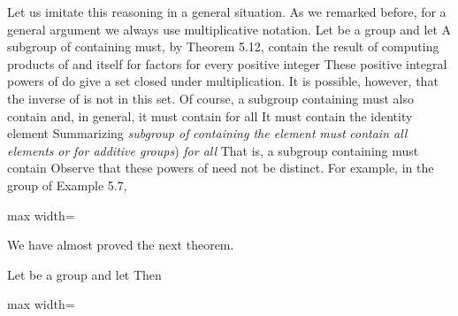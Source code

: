 \documentclass[11pt,oneside]{article}
\begin{document}
\begin{BookBody}
Let us imitate this reasoning in a general situation. As we remarked before, for a general argument we always use multiplicative notation. Let  be a group and let  A subgroup of  containing  must, by Theorem 5.12, contain  the result of computing products of  and itself for  factors for every positive integer  These positive integral powers of  do give a set closed under multiplication. It is possible, however, that the inverse of  is not in this set. Of course, a subgroup containing  must also contain  and, in general, it must contain  for all  It must contain the identity element  Summarizing \textit{subgroup of}  \textit{containing the element}  \textit{must} \textit{contain all elements} \textit{or}  \textit{for additive groups})\textit{ for all}  That is, a subgroup containing  must contain  Observe that these powers  of  need not be distinct. For example, in the group  of Example 5.7,

\begin{center}\begin{adjustbox}{max width=\linewidth}\end{adjustbox}\end{center}

\noindent We have almost proved the next theorem.

 Let  be a group and let  Then

\begin{center}\begin{adjustbox}{max width=\linewidth}\end{adjustbox}\end{center}


\end{BookBody}
\end{document}

